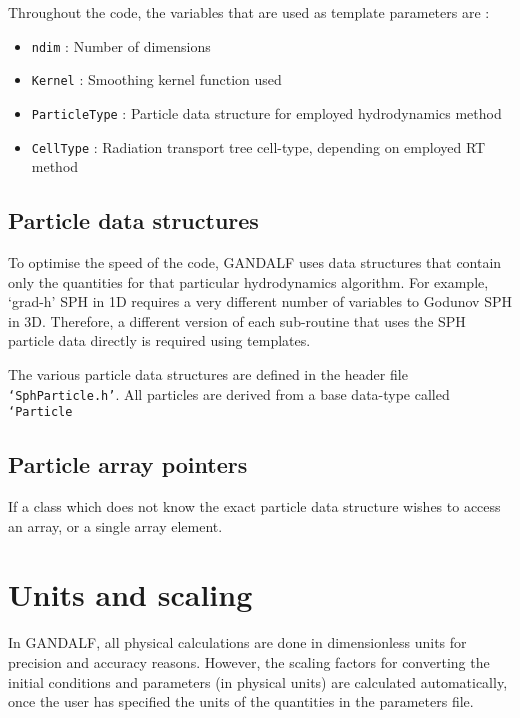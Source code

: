 \documentclass[a4paper]{article}
\newcommand{\var}[1]{\texttt{#1}}
\begin{document}
Throughout the code, the variables that are used as template parameters are :
\begin{itemize}
\item \var{ndim} : Number of dimensions
\item \var{Kernel} : Smoothing kernel function used
\item \var{ParticleType} : Particle data structure for employed hydrodynamics method
\item \var{CellType} : Radiation transport tree cell-type, depending on employed RT method
\end{itemize}


\subsection{Particle data structures}

To optimise the speed of the code, GANDALF uses data structures that contain only the quantities for that particular hydrodynamics algorithm.  For example, `grad-h' SPH in 1D requires a very different number of variables to Godunov SPH in 3D.  Therefore, a different version of each sub-routine that uses the SPH particle data directly is required using templates.

The various particle data structures are defined in the header file \var{`SphParticle.h'}.  All particles are derived from a base data-type called \var{`Particle}




\subsection{Particle array pointers}

If a class which does not know the exact particle data structure wishes to access an array, or a single array element.


\newpage


\section{Units and scaling} \label{S:UNITS}
In GANDALF, all physical calculations are done in dimensionless units for precision and accuracy reasons.  However, the scaling factors for converting the initial conditions and parameters (in physical units) are calculated automatically, once the user has specified the units of the quantities in the parameters file.
\end{document}
